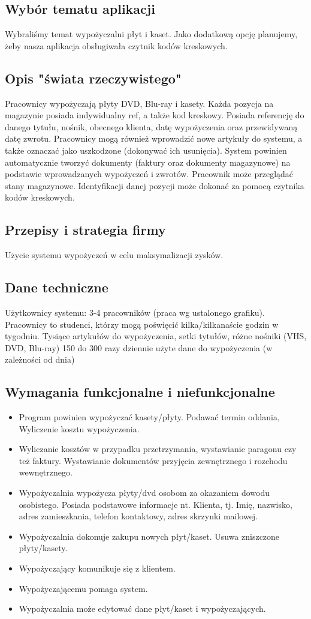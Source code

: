 \documentclass{article}
\begin{document}
\subsection{Wybór tematu aplikacji}
Wybraliśmy temat wypożyczalni płyt i kaset. Jako dodatkową opcję planujemy, żeby nasza aplikacja obsługiwała czytnik kodów kreskowych.

\subsection{Opis "świata rzeczywistego"}
Pracownicy wypożyczają płyty DVD, Blu-ray i kasety. Każda pozycja na magazynie posiada indywidualny ref, a także kod kreskowy. Posiada referencję do danego tytułu, nośnik, obecnego klienta, datę wypożyczenia oraz przewidywaną datę zwrotu. Pracownicy mogą również wprowadzić nowe artykuły do systemu, a także oznaczać jako uszkodzone (dokonywać ich usunięcia). System powinien automatycznie tworzyć dokumenty (faktury oraz dokumenty magazynowe) na podstawie wprowadzanych wypożyczeń i zwrotów. Pracownik może przeglądać stany magazynowe. Identyfikacji danej pozycji może dokonać za pomocą czytnika kodów kreskowych.

\subsection{Przepisy i strategia firmy}
Użycie systemu wypożyczeń w celu maksymalizacji zysków.

\subsection{Dane techniczne}
Użytkownicy systemu: 3-4 pracowników (praca wg ustalonego grafiku).
Pracownicy to studenci, którzy mogą poświęcić kilka/kilkanaście godzin w tygodniu. 
Tysiące artykułów do wypożyczenia, setki tytułów, różne nośniki (VHS, DVD, Blu-ray)
150 do 300 razy dziennie użyte dane do wypożyczenia (w zależności od dnia)

\subsection{Wymagania funkcjonalne i niefunkcjonalne}
\begin{itemize}
\item Program powinien wypożyczać kasety/płyty. Podawać termin oddania, Wyliczenie kosztu wypożyczenia. 
\item Wyliczanie kosztów w przypadku przetrzymania, wystawianie paragonu czy też faktury. Wystawianie dokumentów przyjęcia zewnętrznego i rozchodu wewnętrznego.
\item Wypożyczalnia wypożycza płyty/dvd osobom za okazaniem dowodu osobistego. Posiada podstawowe informacje nt. Klienta, tj. Imię, nazwisko, adres zamieszkania, telefon kontaktowy, adres skrzynki mailowej.
\item Wypożyczalnia dokonuje zakupu nowych płyt/kaset. Usuwa zniszczone płyty/kasety. 
\item Wypożyczający komunikuje się z klientem. 
\item Wypożyczającemu pomaga system.
\item Wypożyczalnia może edytować dane płyt/kaset i wypożyczających.
\end{itemize}
\end{document}
